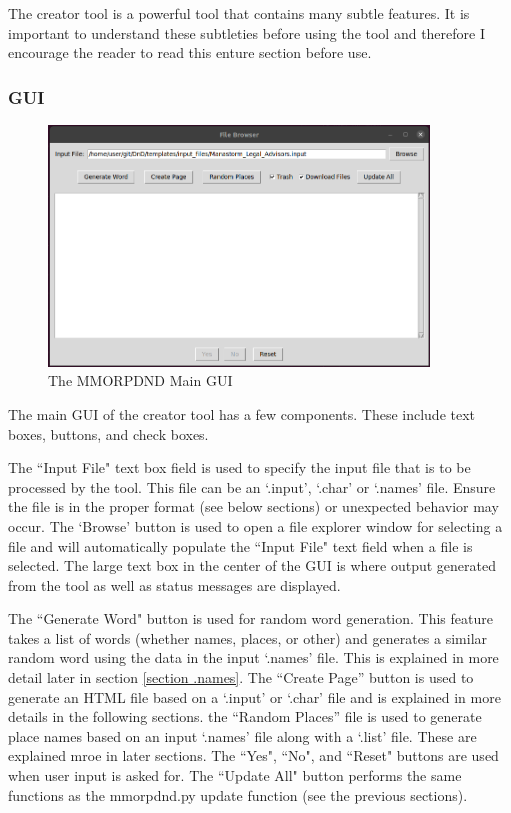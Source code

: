 The creator tool is a powerful tool that contains many subtle features. It is important to understand these subtleties before using the tool and therefore I encourage the reader to read this enture section before use. 

\subsubsection{GUI}

\begin{figure}[h]
	\centering
	\includegraphics[width=0.9\textwidth]{images/creator_gui.png}
	\caption{The MMORPDND Main GUI}
	\label{fig:creator_gui}
\end{figure}

The main GUI of the creator tool has a few components. These include text boxes, buttons, and check boxes. 

The ``Input File" text box field is used to specify the input file that is to be processed by the tool. This file can be an `.input', `.char' or `.names' file. Ensure the file is in the proper format (see below sections) or unexpected behavior may occur. The `Browse' button is used to open a file explorer window for selecting a file and will automatically populate the ``Input File" text field when a file is selected. The large text box in the center of the GUI is where output generated from the tool as well as status messages are displayed.

The ``Generate Word" button is used for random word generation. This feature takes a list of words (whether names, places, or other) and generates a similar random word using the data in the input `.names' file. This is explained in more detail later in section \ref{section .names}. The ``Create Page'' button is used to generate an HTML file based on a `.input' or `.char' file and is explained in more details in the following sections. the ``Random Places'' file is used to generate place names based on an input `.names' file along with a `.list' file. These are explained mroe in later sections. The ``Yes", ``No", and ``Reset" buttons are used when user input is asked for. The ``Update All" button performs the same functions as the mmorpdnd.py update function (see the previous sections).

